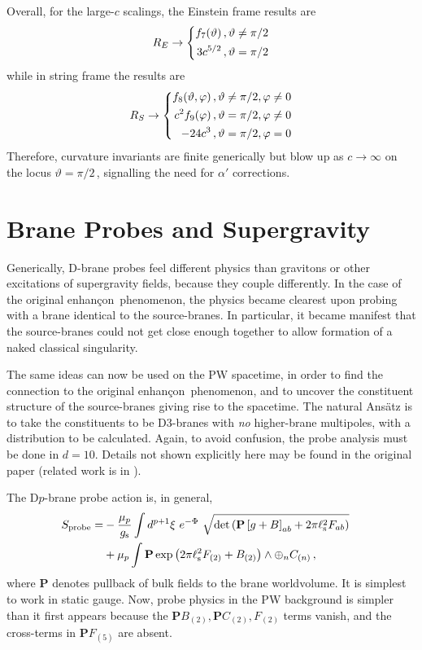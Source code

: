 \documentclass[a4paper,12pt]{amsproc}
\numberwithin{equation}{section}
\def\gs{g_{\rm{s}}}
\def\ls{\ell_{\rm{s}}}
\def\enh{enhan\c con}
\def\detn{$d{=}10$}
\def\bP{\mathbf{P}}
\def\vtpt{$\vartheta=\pi/2$\,}
\begin{document}
Overall, for the large-$c$ scalings, the Einstein frame results are
%
\begin{equation}
R_E \rightarrow 
\left\{ \begin{split}
f_7(\vartheta) \,, \vartheta\not=\pi/2 \cr
3 c^{5/2} \,, \vartheta=\pi/2 \cr
\end{split} \right.
\end{equation}
%
while in string frame the results are
%
\begin{equation}
R_S \rightarrow
\left\{ \begin{split}
f_8(\vartheta,\varphi)  \,, \vartheta\not=\pi/2,\varphi\not=0 \cr
c^2 f_9(\varphi)\,, \vartheta    =\pi/2,\varphi\not=0 \cr
-24 c^3\,, \vartheta    =\pi/2,\varphi    =0 \cr
\end{split} \right.
\end{equation}
%
Therefore, curvature invariants are finite generically but blow up as
$c\rightarrow\infty$ on the locus \vtpt, signalling the need for
$\alpha'$ corrections.

\section{Brane Probes and Supergravity}

Generically, D-brane probes feel different physics than gravitons or
other excitations of supergravity fields, because they couple
differently.  In the case of the original \enh\ phenomenon, the
physics became clearest upon probing with a brane identical to the
source-branes.  In particular, it became manifest that the
source-branes could not get close enough together to allow formation
of a naked classical singularity.

The same ideas can now be used on the PW spacetime, in order to find
the connection to the original \enh\ phenomenon, and to uncover the
constituent structure of the source-branes giving rise to the
spacetime.  The natural Ans{\"a}tz is to take the constituents to be
D3-branes with {\em no} higher-brane multipoles, with a distribution
to be calculated.  Again, to avoid confusion, the probe analysis must
be done in \detn.  Details not shown explicitly here may be found in
the original paper \cite{bpp} (related work is in \cite{evjohpet}).

The D$p$-brane probe action is, in general,
%
\begin{equation}
\begin{split}
S_{\rm probe} = & -{{\mu_p}\over{\gs}} \int d^{p+1}\xi \ e^{-\Phi}\ 
\sqrt{\det\left(\bP\left[g+B\right]_{ab}+2\pi\ls^2F_{ab}\right)}\cr
& +{\mu_p}\int \bP\exp\left(2\pi\ls^2F_{(2)}+B_{(2)}\right)\wedge
\oplus_n C_{(n)} \,,
\end{split}
\end{equation}
%
where $\bP$ denotes pullback of bulk fields to the brane worldvolume.
It is simplest to work in static gauge.  Now, probe physics in the PW
background is simpler than it first appears because the $\bP B_{(2)},
\bP C_{(2)}, F_{(2)}$ terms vanish, and the cross-terms in $\bP
F_{(5)}$ are absent.
\end{document}
